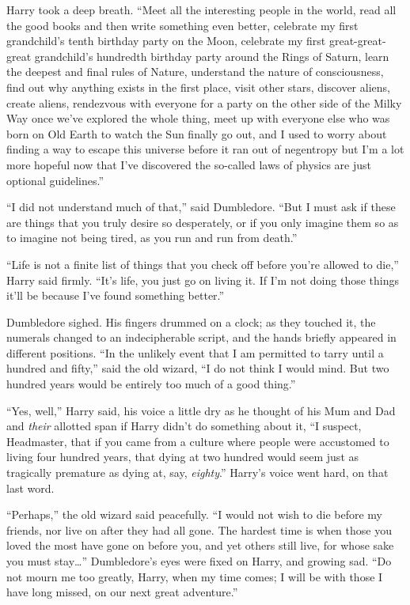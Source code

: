 Harry took a deep breath. ``Meet all the interesting people in the
world, read all the good books and then write something even better,
celebrate my first grandchild's tenth birthday party on the Moon,
celebrate my first great-great-great grandchild's hundredth birthday
party around the Rings of Saturn, learn the deepest and final rules of
Nature, understand the nature of consciousness, find out why anything
exists in the first place, visit other stars, discover aliens, create
aliens, rendezvous with everyone for a party on the other side of the
Milky Way once we've explored the whole thing, meet up with everyone
else who was born on Old Earth to watch the Sun finally go out, and I
used to worry about finding a way to escape this universe before it ran
out of negentropy but I'm a lot more hopeful now that I've discovered
the so-called laws of physics are just optional guidelines.''

``I did not understand much of that,'' said Dumbledore. ``But I must ask
if these are things that you truly desire so desperately, or if you only
imagine them so as to imagine not being tired, as you run and run from
death.''

``Life is not a finite list of things that you check off before you're
allowed to die,'' Harry said firmly. ``It's life, you just go on living
it. If I'm not doing those things it'll be because I've found something
better.''

Dumbledore sighed. His fingers drummed on a clock; as they touched it,
the numerals changed to an indecipherable script, and the hands briefly
appeared in different positions. ``In the unlikely event that I am
permitted to tarry until a hundred and fifty,'' said the old wizard, ``I
do not think I would mind. But two hundred years would be entirely too
much of a good thing.''

``Yes, well,'' Harry said, his voice a little dry as he thought of his
Mum and Dad and \emph{their} allotted span if Harry didn't do something
about it, ``I suspect, Headmaster, that if you came from a culture where
people were accustomed to living four hundred years, that dying at two
hundred would seem just as tragically premature as dying at, say,
\emph{eighty}.'' Harry's voice went hard, on that last word.

``Perhaps,'' the old wizard said peacefully. ``I would not wish to die
before my friends, nor live on after they had all gone. The hardest time
is when those you loved the most have gone on before you, and yet others
still live, for whose sake you must stay\ldots{}'' Dumbledore's eyes
were fixed on Harry, and growing sad. ``Do not mourn me too greatly,
Harry, when my time comes; I will be with those I have long missed, on
our next great adventure.''

